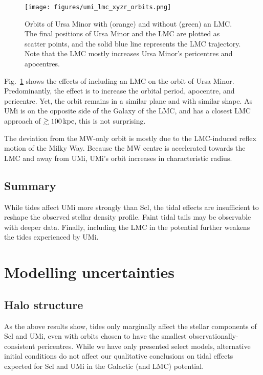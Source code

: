 \begin{figure}
\centering
\texttt{[image: figures/umi\_lmc\_xyzr\_orbits.png]}
\caption[Ursa Minor orbits with LMC]{Orbits of Ursa Minor with (orange)
and without (green) an LMC. The final positions of Ursa Minor and the
LMC are plotted as scatter points, and the solid blue line represents
the LMC trajectory. Note that the LMC mostly increases Ursa Minor's
pericentres and apocentres.}\label{fig:umi_orbits_lmc}
\end{figure}

Fig.~\ref{fig:umi_orbits_lmc} shows the effects of including an LMC on
the orbit of Ursa Minor. Predominantly, the effect is to increase the
orbital period, apocentre, and pericentre. Yet, the orbit remains in a
similar plane and with similar shape. As UMi is on the opposite side of
the Galaxy of the LMC, and has a closest LMC approach of
\(\gtrsim 100\,{\rm kpc}\), this is not surprising.

The deviation from the MW-only orbit is mostly due to the LMC-induced
reflex motion of the Milky Way. Because the MW centre is accelerated
towards the LMC and away from UMi, UMi's orbit increases in
characteristic radius.

\subsection{Summary}\label{summary-1}

While tides affect UMi more strongly than Scl, the tidal effects are
insufficient to reshape the observed stellar density profile. Faint
tidal tails may be observable with deeper data. Finally, including the
LMC in the potential further weakens the tides experienced by UMi.

\section{Modelling uncertainties}\label{modelling-uncertainties}

\subsection{Halo structure}\label{halo-structure}

As the above results show, tides only marginally affect the stellar
components of Scl and UMi, even with orbits chosen to have the smallest
observationally-consistent pericentres. While we have only presented
select models, alternative initial conditions do not affect our
qualitative conclusions on tidal effects expected for Scl and UMi in the
Galactic (and LMC) potential.


